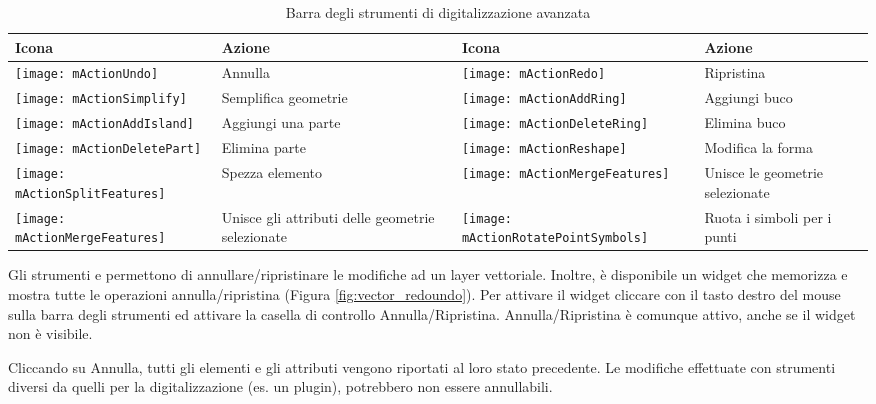 \begin{table}[h]
\centering
\small
\begin{tabular}{|l|p{6.9cm}|l|p{6.9cm}|}
\hline \textbf{Icona} & \textbf{Azione} & \textbf{Icona} & \textbf{Azione} \\
\hline \texttt{[image: mActionUndo]}
   & Annulla
   & \texttt{[image: mActionRedo]}
   & Ripristina \\
\hline \texttt{[image: mActionSimplify]}
   & Semplifica geometrie
   & \texttt{[image: mActionAddRing]}
   & Aggiungi buco \\
\hline \texttt{[image: mActionAddIsland]}
   & Aggiungi una parte
   & \texttt{[image: mActionDeleteRing]}
   & Elimina buco \\
\hline \texttt{[image: mActionDeletePart]}
   & Elimina parte
   & \texttt{[image: mActionReshape]}
   & Modifica la forma \\
\hline \texttt{[image: mActionSplitFeatures]}
   & Spezza elemento
   & \texttt{[image: mActionMergeFeatures]}
   & Unisce le geometrie selezionate \\
\hline \texttt{[image: mActionMergeFeatures]}
   & Unisce gli attributi delle geometrie selezionate
   &\texttt{[image: mActionRotatePointSymbols]}
   & Ruota i simboli per i punti \\
\hline
\end{tabular}
\caption{Barra degli strumenti di digitalizzazione avanzata}\label{tab:advanced_editing}
\end{table}


Gli strumenti  e  
permettono di annullare/ripristinare le modifiche ad un layer vettoriale. Inoltre, è 
disponibile un widget che memorizza e mostra tutte le operazioni annulla/ripristina
(Figura \ref{fig:vector_redoundo}). Per attivare il widget cliccare con il tasto 
destro del mouse sulla barra degli strumenti ed attivare la casella di controllo 
Annulla/Ripristina. Annulla/Ripristina è comunque attivo, anche se il widget non è
visibile.

Cliccando su Annulla, tutti gli elementi e gli attributi vengono riportati al loro stato 
precedente. Le modifiche effettuate con strumenti diversi da quelli per la digitalizzazione
(es. un plugin), potrebbero non essere annullabili.

